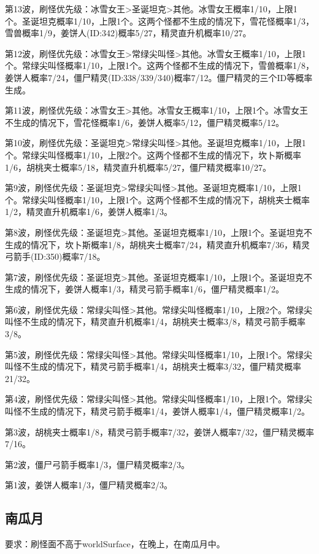 第13波，刷怪优先级：冰雪女王>圣诞坦克>其他。冰雪女王概率1/10，上限1个。圣诞坦克概率1/10，上限1个。这两个怪都不生成的情况下，雪花怪概率1/3，雪兽概率1/9，姜饼人(ID:342)概率5/27，精灵直升机概率10/27。

第12波，刷怪优先级：冰雪女王>常绿尖叫怪>其他。冰雪女王概率1/10，上限1个。常绿尖叫怪概率1/10，上限1个。这两个怪都不生成的情况下，雪兽概率1/8，姜饼人概率7/24，僵尸精灵(ID:338/339/340)概率7/12。僵尸精灵的三个ID等概率生成。

第11波，刷怪优先级：冰雪女王>其他。冰雪女王概率1/10，上限1个。冰雪女王不生成的情况下，雪花怪概率1/6，姜饼人概率5/12，僵尸精灵概率5/12。

第10波，刷怪优先级：圣诞坦克>常绿尖叫怪>其他。圣诞坦克概率1/10，上限1个。常绿尖叫怪概率1/10，上限2个。这两个怪都不生成的情况下，坎卜斯概率1/6，胡桃夹士概率5/18，精灵直升机概率5/27，僵尸精灵概率10/27。

第9波，刷怪优先级：圣诞坦克>常绿尖叫怪>其他。圣诞坦克概率1/10，上限1个。常绿尖叫怪概率1/10，上限1个。这两个怪都不生成的情况下，胡桃夹士概率1/2，精灵直升机概率1/6，姜饼人概率1/3。

第8波，刷怪优先级：圣诞坦克>其他。圣诞坦克概率1/10，上限1个。圣诞坦克不生成的情况下，坎卜斯概率1/8，胡桃夹士概率7/24，精灵直升机概率7/36，精灵弓箭手(ID:350)概率7/18。

第7波，刷怪优先级：圣诞坦克>其他。圣诞坦克概率1/10，上限1个。圣诞坦克不生成的情况下，姜饼人概率1/3，精灵弓箭手概率1/6，僵尸精灵概率1/2。

第6波，刷怪优先级：常绿尖叫怪>其他。常绿尖叫怪概率1/10，上限2个。常绿尖叫怪不生成的情况下，精灵直升机概率1/4，胡桃夹士概率3/8，精灵弓箭手概率3/8。

第5波，刷怪优先级：常绿尖叫怪>其他。常绿尖叫怪概率1/10，上限1个。常绿尖叫怪不生成的情况下，精灵弓箭手概率1/4，胡桃夹士概率3/32，僵尸精灵概率21/32。

第4波，刷怪优先级：常绿尖叫怪>其他。常绿尖叫怪概率1/10，上限1个。常绿尖叫怪不生成的情况下，精灵弓箭手概率1/4，姜饼人概率1/4，僵尸精灵概率1/2。

第3波，胡桃夹士概率1/8，精灵弓箭手概率7/32，姜饼人概率7/32，僵尸精灵概率7/16。

第2波，僵尸弓箭手概率1/3，僵尸精灵概率2/3。

第1波，姜饼人概率1/3，僵尸精灵概率2/3。

\subsection{南瓜月}
要求：刷怪面不高于worldSurface，在晚上，在南瓜月中。

